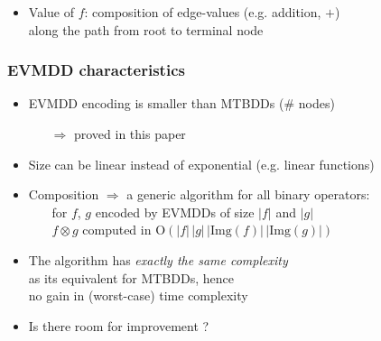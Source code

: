 \documentclass{beamer}
\renewcommand{\O}{\mathrm{O}}
\begin{document}
\begin{frame}
\begin{itemize}
\begin{center}
  \end{center}
  \item 
  Value of $f$: composition of edge-values (e.g. addition, $+$)\\
  along the path from root to terminal node
  \end{itemize}
\end{frame}

\begin{frame}
  \frametitle{EVMDD characteristics}
  \begin{itemize}
  \item EVMDD encoding is smaller than MTBDDs ($\#$ nodes)
    \begin{itemize}
      \item [$\Rightarrow$] proved in this paper
    \end{itemize}
  \item Size can be linear instead of exponential (e.g. linear functions)
  \item Composition $\Rightarrow$  a generic algorithm for all binary operators:\\
    ~~~ for $f$, $g$ encoded by EVMDDs of size $|f|$ and $|g|$\\
    ~~~ $f\otimes g$ computed in $\O\left(|f|\,|g|\,|\mathrm{Img}(f)|\,|\mathrm{Img}(g)|\right)$
  \item The algorithm has \emph{exactly the same complexity}\\
    as its equivalent for MTBDDs, hence\\
    \alert{no gain} in (worst-case) time complexity
  \item Is there room for improvement ?
  \end{itemize}
\end{frame}
\end{document}
